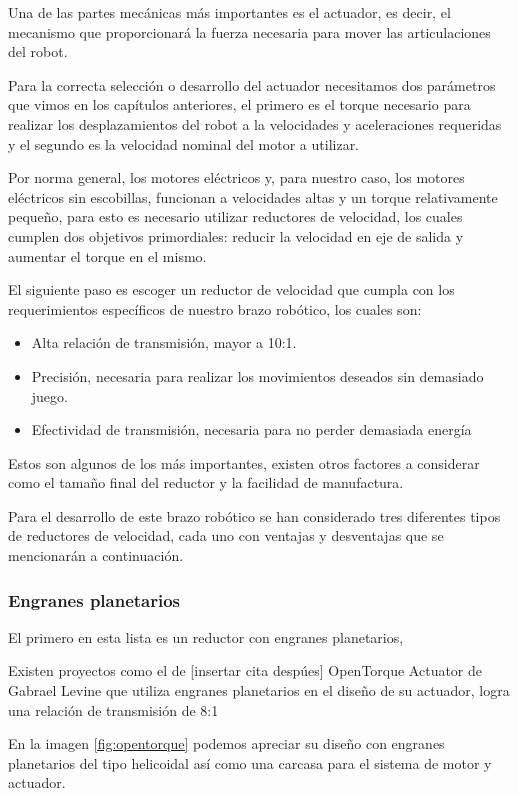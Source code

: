 Una de las partes mecánicas más importantes es el actuador, es decir, el mecanismo que proporcionará la fuerza necesaria para mover las articulaciones del robot.

Para la correcta selección o desarrollo del actuador necesitamos dos parámetros que vimos en los capítulos anteriores, el primero es el torque necesario para realizar los desplazamientos del robot a la velocidades y aceleraciones requeridas y el segundo es la velocidad nominal del motor a utilizar.

Por norma general, los motores eléctricos y, para nuestro caso, los motores eléctricos sin escobillas, funcionan a velocidades altas y un torque relativamente pequeño, para esto es necesario utilizar reductores de velocidad, los cuales cumplen dos objetivos primordiales: reducir la velocidad en eje de salida y aumentar el torque en el mismo.

El siguiente paso es escoger un reductor de velocidad que cumpla con los requerimientos específicos de nuestro brazo robótico, los cuales son:

\begin{itemize}
\itemsep0em
\item Alta relación de transmisión, mayor a 10:1.
\item Precisión, necesaria para realizar los movimientos deseados sin demasiado juego. 
\item Efectividad de transmisión, necesaria para no perder demasiada energía
\end{itemize}

Estos son algunos de los más importantes, existen otros factores a considerar como el tamaño final del reductor y la facilidad de manufactura.

Para el desarrollo de este brazo robótico se han considerado tres diferentes tipos de reductores de velocidad, cada uno con ventajas y desventajas que se mencionarán a continuación.

\subsubsection{Engranes planetarios}

El primero en esta lista es un reductor con engranes planetarios, 

Existen proyectos como el de [insertar cita despúes] OpenTorque Actuator de Gabrael Levine que utiliza engranes planetarios en el diseño de su actuador, logra una relación de transmisión de 8:1

En la imagen \ref{fig:opentorque} podemos apreciar su diseño con engranes planetarios del tipo  helicoidal así como una carcasa para el sistema de motor y actuador. 

